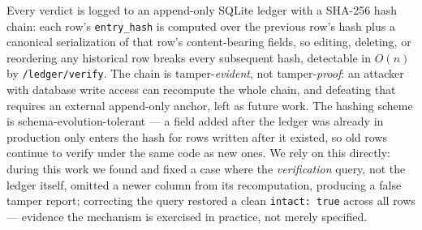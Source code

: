 
Every verdict is logged to an append-only SQLite ledger with a SHA-256 hash
chain: each row's \texttt{entry\_hash} is computed over the previous row's
hash plus a canonical serialization of that row's content-bearing fields, so
editing, deleting, or reordering any historical row breaks every subsequent
hash, detectable in $O(n)$ by \texttt{/ledger/verify}. The chain is
tamper-\emph{evident}, not tamper-\emph{proof}: an attacker with database
write access can recompute the whole chain, and defeating that requires an
external append-only anchor, left as future work. The hashing scheme is
schema-evolution-tolerant --- a field added after the ledger was already in
production only enters the hash for rows written after it existed, so old
rows continue to verify under the same code as new ones. We rely on this
directly: during this work we found and fixed a case where the
\emph{verification} query, not the ledger itself, omitted a newer column
from its recomputation, producing a false tamper report; correcting the
query restored a clean \texttt{intact: true} across all rows --- evidence
the mechanism is exercised in practice, not merely specified.
